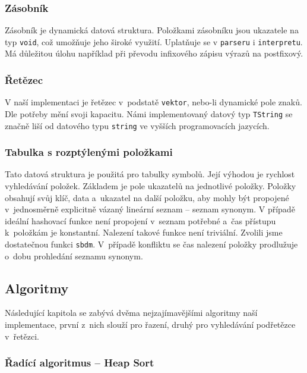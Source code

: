 \documentclass[a4paper, 12pt]{article}
\begin{document}
\subsubsection{Zásobník}
Zásobník je dynamická datová struktura. Položkami zásobníku jsou ukazatele
na typ \texttt{void}, což umožňuje jeho široké využití.
Uplatňuje se v \texttt{parseru} i \texttt{interpretu}. Má důležitou úlohu
například při převodu infixového zápisu výrazů na postfixový.

\subsubsection{Řetězec}
V naší implementaci je řetězec v~podstatě \texttt{vektor}, nebo-li dynamické pole znaků.
Dle potřeby mění svoji kapacitu. Námi implementovaný datový typ \texttt{TString}
se značně liší od datového typu \texttt{string} ve vyšších programovacích
jazycích.

\subsubsection{Tabulka s rozptýlenými položkami}

Tato datová struktura je použitá pro tabulky symbolů. Její výhodou je rychlost
vyhledávání položek. Základem je pole ukazatelů na jednotlivé položky. Položky
obsahují svůj klíč, data a~ukazatel na další položku, aby mohly být propojené
v~jednosměrně explicitně vázaný lineární seznam -- seznam synonym. V případě ideální
hashovací funkce není propojení v~seznam potřebné a~čas přístupu k~položkám je
konstantní. Nalezení takové funkce není triviální. Zvolili jsme dostatečnou
funkci \texttt{sbdm}\cite{sbdm}.
V~případě konfliktu se čas nalezení položky prodlužuje o~dobu prohledání
seznamu synonym.

\subsection{Algoritmy}

Následující kapitola se zabývá dvěma nejzajímavějšími algoritmy naší
implementace, první z~nich slouží pro řazení, druhý pro vyhledávání
podřetězce v~řetězci.

\subsubsection{Řadící algoritmus -- Heap Sort}
\end{document}
